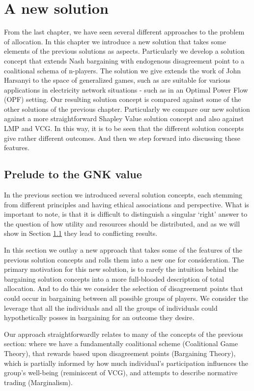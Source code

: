 \chapter{A new solution}
\label{cha:new_solution}

From the last chapter, we have seen several different approaches to the problem of allocation.
In this chapter we introduce a new solution that takes some elements of the previous solutions as aspects.
Particularly we develop a solution concept that extends Nash bargaining with endogenous disagreement point to a coalitional schema of n-players.
The solution we give extends the work of John Harsanyi to the space of generalized games, such as are suitable for various applications in electricity network situations - such as in an Optimal Power Flow (OPF) setting.
Our resulting solution concept is compared against some of the other solutions of the previous chapter. Particularly we compare our new solution against a more straightforward Shapley Value solution concept and also against LMP and VCG.
In this way, it is to be seen that the different solution concepts give rather different outcomes.
And then we step forward into discussing these features.

\section{Prelude to the GNK value}

In the previous section we introduced several solution concepts, each stemming from different principles and having ethical associations and perspective.
What is important to note, is that it is difficult to distinguish a singular `right' answer to the question of how utility and resources should be distributed, and as we will show in Section \ref{} they lead to conflicting results.

In this section we outlay a new approach that takes some of the features of the previous solution concepts and rolls them into a new one for consideration.
The primary motivation for this new solution, is to rarefy the intuition behind the bargaining solution concepts into a more full-blooded description of total allocation.
And to do this we consider the selection of disagreement points that could occur in bargaining between all possible groups of players.
We consider the leverage that all the individuals and all the groups of individuals could hypothetically posses in bargaining for an outcome they desire.

Our approach straightforwardly relates to many of the concepts of the previous section: where we have a fundamentally coalitional scheme (Coalitional Game Theory), that rewards based upon disagreement points (Bargaining Theory), which is partially informed by how much individual's participation influences the group's well-being (reminiscent of VCG), and attempts to describe normative trading (Marginalism).

